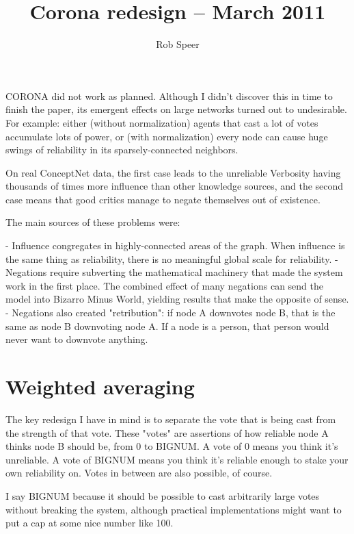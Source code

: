 
\title{Corona redesign -- March 2011}
\author{Rob Speer}


\maketitle

CORONA did not work as planned. Although I didn't discover this in time to
finish the paper, its emergent effects on large networks turned out to
undesirable.  For example: either (without normalization) agents that cast a
lot of votes accumulate lots of power, or (with normalization) every node can
cause huge swings of reliability in its sparsely-connected neighbors.

On real ConceptNet data, the first case leads to the unreliable Verbosity
having thousands of times more influence than other knowledge sources, and the
second case means that good critics manage to negate themselves out of
existence.

The main sources of these problems were:

- Influence congregates in highly-connected areas of the graph. When influence
  is the same thing as reliability, there is no meaningful global scale for
  reliability.
- Negations require subverting the mathematical machinery that made the system
  work in the first place. The combined effect of many negations can send the
  model into Bizarro Minus World, yielding results that make the opposite of
  sense.
- Negations also created "retribution": if node A downvotes node B, that is the
  same as node B downvoting node A. If a node is a person, that person would
  never want to downvote anything.

\section{Weighted averaging}

The key redesign I have in mind is to separate the vote that is being cast from
the strength of that vote. These "votes" are assertions of how reliable node A
thinks node B should be, from 0 to BIGNUM. A vote of 0 means you think it's
unreliable. A vote of BIGNUM means you think it's reliable enough to stake your
own reliability on. Votes in between are also possible, of course.

I say BIGNUM because it should be possible to cast arbitrarily large votes
without breaking the system, although practical implementations might want to
put a cap at some nice number like 100.

